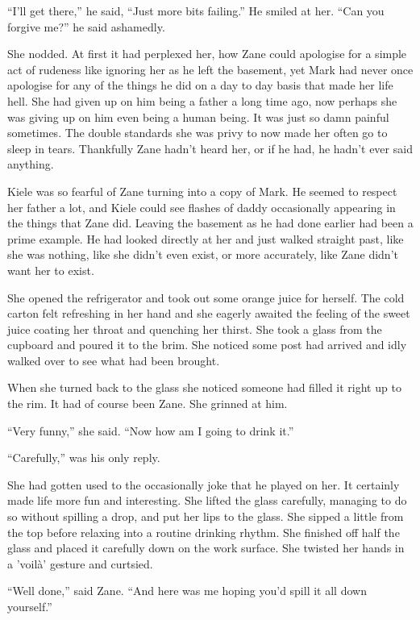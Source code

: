  ``I'll get there,'' he said, ``Just more bits failing.''  He smiled at her.  ``Can you forgive me?'' he said ashamedly.

She nodded.  At first it had perplexed her, how Zane could apologise for a simple act of rudeness like ignoring her as he left the basement, yet Mark had never once apologise for any of the things he did on a day to day basis that made her life hell.  She had given up on him being a father a long time ago, now perhaps she was giving up on him even being a human being.  It was just so damn painful sometimes.  The double standards she was privy to now made her often go to sleep in tears.  Thankfully Zane hadn't heard her, or if he had, he hadn't ever said anything.  

Kiele was so fearful of Zane turning into a copy of Mark.  He seemed to respect her father a lot, and Kiele could see flashes of daddy occasionally appearing in the things that Zane did.  Leaving the basement as he had done earlier had been a prime example.  He had looked directly at her and just walked straight past, like she was nothing, like she didn't even exist, or more accurately, like Zane didn't want her to exist.

She opened the refrigerator and took out some orange juice for herself.  The cold carton felt refreshing in her hand and she eagerly awaited the feeling of the sweet juice coating her throat and quenching her thirst.  She took a glass from the cupboard and poured it to the brim.  She noticed some post had arrived and idly walked over to see what had been brought.

When she turned back to the glass she noticed someone had filled it right up to the rim.  It had of course been Zane.  She grinned at him.

``Very funny,'' she said.  ``Now how am I going to drink it.''

``Carefully,'' was his only reply.   

She had gotten used to the occasionally joke that he played on her.  It certainly made life more fun and interesting.  She lifted the glass carefully, managing to do so without spilling a drop, and put her lips to the glass.  She sipped a little from the top before relaxing into a routine drinking rhythm.  She finished off half the glass and placed it carefully down on the work surface.  She twisted her hands in a 'voilà' gesture and curtsied.

``Well done,'' said Zane.  ``And here was me hoping you'd spill it all down yourself.''

